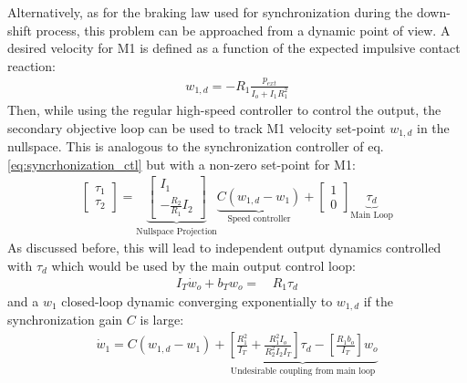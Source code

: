 %
Alternatively, as for the braking law used for synchronization during the down-shift process, this problem can be approached from a dynamic point of view. A desired velocity for M1 is defined as a function of the expected impulsive contact reaction:
%
\begin{align}
w_{1,d}  = - R_1 \frac{ p_{ext} }{I_o + I_1 R_1^2}
\label{eq:dsdm_impact_gen_delta_w1}
\end{align}
%
Then, while using the regular high-speed controller to control the output, the secondary objective loop can be used to track M1 velocity set-point $w_{1,d}$ in the nullspace. This is analogous to the synchronization controller of eq. \eqref{eq:syncrhonization_ctl} but with a non-zero set-point for M1:
%
\begin{align}
\left[ \begin{array}{c}
\tau_1 \\
\tau_2
\end{array} \right]
 = 
\underbrace{\left[ \begin{array}{c}
I_1 \\
-\frac{R_2 }{R_1} I_2 
\end{array} \right]}_{\text{Nullspace Projection}} \underbrace{C (w_{1,d} -  w_1)}_{\text{Speed controller}} + 
\left[ \begin{array}{c}
1 \\
0 
\end{array} \right]  \underbrace{ \tau_d }_{\text{Main Loop}}
\end{align}
%
As discussed before, this will lead to independent output dynamics controlled with $\tau_d$ which would be used by the main output control loop:
\begin{align}
I_T \dot{w}_o +
b_T  w_o
=& \, R_1 \tau_d  
\end{align}
and a $w_1$ closed-loop dynamic converging exponentially to $w_{1,d}$ if the synchronization gain $C$ is large:
\begin{align}
 \dot{w}_1 = C \left( w_{1,d} - w_1 \right) + \underbrace{\left[\frac{R_1^2}{I_T} + \frac{R_1^2 I_o}{R_2^2 I_2 I_T} \right] \tau_d - \left[\frac{R_1 b_o}{I_T}\right] w_o }_{\text{Undesirable coupling from main loop}}
\end{align}

